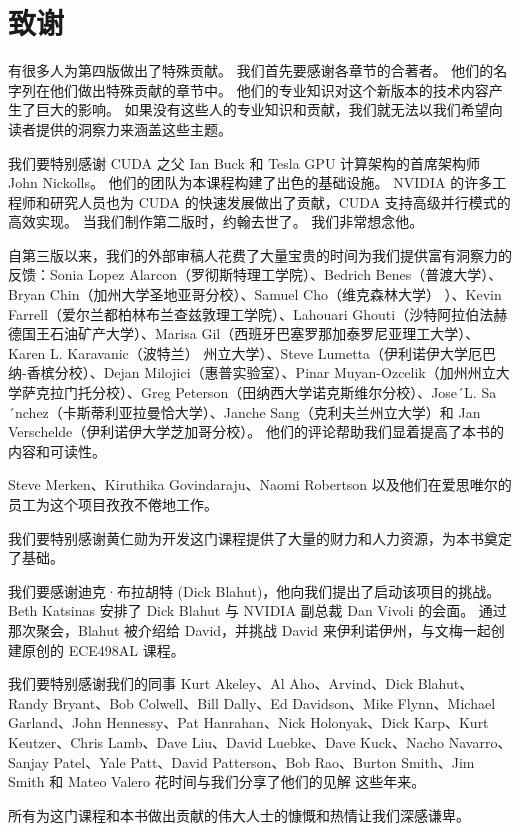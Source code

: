 \section*{致谢}
有很多人为第四版做出了特殊贡献。 我们首先要感谢各章节的合著者。 他们的名字列在他们做出特殊贡献的章节中。 他们的专业知识对这个新版本的技术内容产生了巨大的影响。 如果没有这些人的专业知识和贡献，我们就无法以我们希望向读者提供的洞察力来涵盖这些主题。

我们要特别感谢 CUDA 之父 Ian Buck 和 Tesla GPU 计算架构的首席架构师 John Nickolls。 他们的团队为本课程构建了出色的基础设施。 NVIDIA 的许多工程师和研究人员也为 CUDA 的快速发展做出了贡献，CUDA 支持高级并行模式的高效实现。 当我们制作第二版时，约翰去世了。 我们非常想念他。

自第三版以来，我们的外部审稿人花费了大量宝贵的时间为我们提供富有洞察力的反馈：Sonia Lopez Alarcon（罗彻斯特理工学院）、Bedrich Benes（普渡大学）、Bryan Chin（加州大学圣地亚哥分校）、Samuel Cho（维克森林大学） ）、Kevin Farrell（爱尔兰都柏林布兰查兹敦理工学院）、Lahouari Ghouti（沙特阿拉伯法赫德国王石油矿产大学）、Marisa Gil（西班牙巴塞罗那加泰罗尼亚理工大学）、Karen L. Karavanic（波特兰） 州立大学）、Steve Lumetta（伊利诺伊大学厄巴纳-香槟分校）、Dejan Milojici（惠普实验室）、Pinar Muyan-Ozcelik（加州州立大学萨克拉门托分校）、Greg Peterson（田纳西大学诺克斯维尔分校）、Jose´L. Sa´nchez（卡斯蒂利亚拉曼恰大学）、Janche Sang（克利夫兰州立大学）和 Jan Verschelde（伊利诺伊大学芝加哥分校）。 他们的评论帮助我们显着提高了本书的内容和可读性。

Steve Merken、Kiruthika Govindaraju、Naomi Robertson 以及他们在爱思唯尔的员工为这个项目孜孜不倦地工作。

我们要特别感谢黄仁勋为开发这门课程提供了大量的财力和人力资源，为本书奠定了基础。

我们要感谢迪克·布拉胡特 (Dick Blahut)，他向我们提出了启动该项目的挑战。 Beth Katsinas 安排了 Dick Blahut 与 NVIDIA 副总裁 Dan Vivoli 的会面。 通过那次聚会，Blahut 被介绍给 David，并挑战 David 来伊利诺伊州，与文梅一起创建原创的 ECE498AL 课程。

我们要特别感谢我们的同事 Kurt Akeley、Al Aho、Arvind、Dick Blahut、Randy Bryant、Bob Colwell、Bill Dally、Ed Davidson、Mike Flynn、Michael Garland、John Hennessy、Pat Hanrahan、Nick Holonyak、Dick Karp、Kurt Keutzer、Chris Lamb、Dave Liu、David Luebke、Dave Kuck、Nacho Navarro、Sanjay Patel、Yale Patt、David Patterson、Bob Rao、Burton Smith、Jim Smith 和 Mateo Valero 花时间与我们分享了他们的见解 这些年来。

所有为这门课程和本书做出贡献的伟大人士的慷慨和热情让我们深感谦卑。
